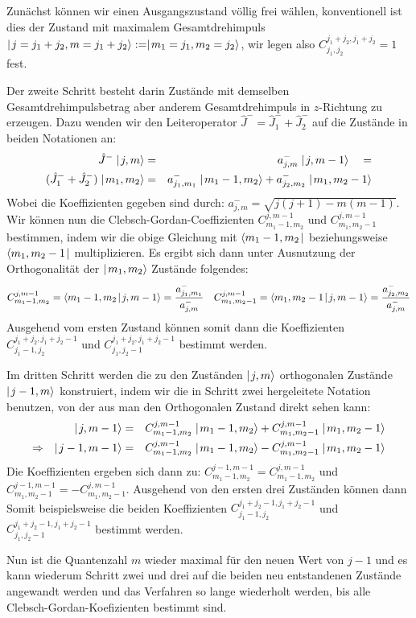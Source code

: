 \begin{itemize1}
	\item Zunächst können wir einen Ausgangszustand völlig frei wählen, konventionell ist dies der Zustand mit maximalem Gesamtdrehimpuls $\mid\!\!\!\,\,{j=j_1+j_2,m=j_1+j_2}\rangle:=\mid\!\!\!\,\,{m_1=j_1,m_2=j_2}\rangle$, wir legen also $C_{j_1,j_2}^{j_1+j_2,j_1+j_2}=1$ fest. 
	\item Der zweite Schritt besteht darin Zustände mit demselben Gesamtdrehimpulsbetrag aber anderem Gesamtdrehimpuls in $z$-Richtung zu erzeugen. Dazu wenden wir den Leiteroperator $\hat{J}^-=\hat{J}^-_1+\hat{J}^-_2$ auf die Zustände in beiden Notationen an: 
	\begin{eqnarray*}
		\hat{J}^- \ket{j,m} &=& a^-_{j,m} \ket{j,m-1} \quad =
		\\ 
		(\hat{J}^-_1+\hat{J}^-_2) \ket{m_1,m_2} &=& a^-_{j_1,m_1}\ket{m_1-1,m_2} + a^-_{j_2,m_2}\ket{m_1,m_2-1}
	\end{eqnarray*}
	Wobei die Koeffizienten gegeben sind  durch: $a^-_{j,m}=\sqrt{j(j+1)-m(m-1)}$. Wir können nun die Clebsch-Gordan-Coeffizienten $C^{j,m-1}_{m_1-1,m_2}$ und $C^{j,m-1}_{m_1,m_2-1}$ bestimmen, indem wir die obige Gleichung mit $\langle{m_1-1,m_2}\!\!\!\,\,\mid$ beziehungsweise $\langle{m_1,m_2-1}\!\!\!\,\,\mid$ multiplizieren. Es ergibt sich dann unter Ausnutzung der Orthogonalität der $\mid\!\!\!\,\,{m_1,m_2}\rangle$ Zustände folgendes: 
	\begin{eqnarray*}
	C^{j,m-1}_{m_1-1,m_2} = \braket{m_1-1,m_2}{j,m-1} = \frac{a^-_{j_1,m_1}}{a^-_{j,m}} && C^{j,m-1}_{m_1,m_2-1} = \braket{m_1,m_2-1}{j,m-1} = \frac{a^-_{j_2,m_2}}{a^-_{j,m}}
	\end{eqnarray*}
	Ausgehend vom ersten Zustand können somit dann die Koeffizienten $C^{j_1+j_2,j_1+j_2-1}_{j_1-1,j_2}$ und $C^{j_1+j_2,j_1+j_2-1}_{j_1,j_2-1}$ bestimmt werden. 
	\item Im dritten Schritt werden die zu den Zuständen $\mid\!\!\!\,\,{j,m}\rangle$ orthogonalen Zustände $\mid\!\!\!\,\,{j-1,m}\rangle$ konstruiert, indem wir die in Schritt zwei hergeleitete Notation benutzen, von der aus man den Orthogonalen Zustand direkt sehen kann: 
	\begin{eqnarray*}
	\ket{j,m-1} &=& C^{j,m-1}_{m_1-1,m_2} \ket{m_1-1,m_2} + C^{j,m-1}_{m_1,m_2-1} \ket{m_1,m_2-1}
	\\
	\Rightarrow\quad \ket{j-1,m-1} &=& C^{j,m-1}_{m_1-1,m_2} \ket{m_1-1,m_2} - C^{j,m-1}_{m_1,m_2-1} \ket{m_1,m_2-1}
	\end{eqnarray*}
	Die Koeffizienten ergeben sich dann zu: $C^{j-1,m-1}_{m_1-1,m_2}=C^{j,m-1}_{m_1-1,m_2}$ und $C^{j-1,m-1}_{m_1,m_2-1}=-C^{j,m-1}_{m_1,m_2-1}$. Ausgehend von den ersten drei Zuständen können dann  Somit beispielsweise die beiden Koeffizienten $C_{j_1-1,j_2}^{j_1+j_2-1,j_1+j_2-1}$ und $C_{j_1,j_2-1}^{j_1+j_2-1,j_1+j_2-1}$ bestimmt werden. 
	\item Nun ist die Quantenzahl $m$ wieder maximal für den neuen Wert von $j-1$ und es kann wiederum Schritt zwei und drei auf die beiden neu entstandenen Zustände angewandt werden und das Verfahren so lange wiederholt werden, bis alle Clebsch-Gordan-Koefizienten bestimmt sind. 
\end{itemize1}

%